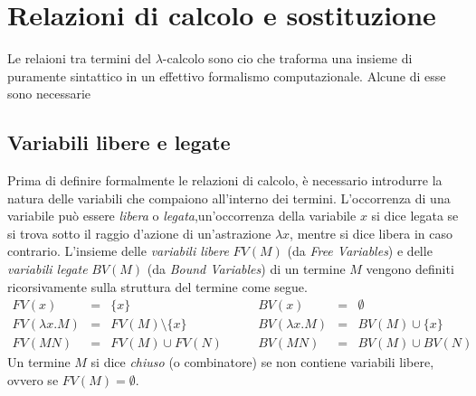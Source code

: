 \section{Relazioni di calcolo e sostituzione}
Le relaioni tra termini del $\lambda$-calcolo sono cio che traforma una insieme di puramente sintattico in un effettivo formalismo computazionale. 
Alcune di esse sono necessarie 

\subsection{Variabili libere e legate}
Prima di definire formalmente le relazioni di calcolo, è necessario introdurre la natura delle variabili che compaiono all'interno dei termini. L'occorrenza 
di una variabile può essere \emph{libera} o \emph{legata},un'occorrenza della variabile $x$ si dice legata se si trova sotto il raggio d'azione di un'astrazione 
$\lambda x$, mentre si dice libera in caso contrario. L'insieme delle \emph{variabili libere} $FV(M)$ (da \emph{Free Variables}) e delle \emph{variabili legate} 
$BV(M)$ (da \emph{Bound Variables}) di un termine $M$ vengono definiti ricorsivamente sulla struttura del termine come segue.
\begin{equation}
    \begin{array}{lcl}
        FV(x)            & = & \{x\}                 \\
        FV(\lambda x. M) & = & FV(M) \setminus \{x\} \\
        FV(M N)          & = & FV(M) \cup FV(N)
    \end{array}
    \qquad
    \begin{array}{lcl}
        BV(x)            & = & \emptyset        \\
        BV(\lambda x. M) & = & BV(M) \cup \{x\} \\
        BV(M N)          & = & BV(M) \cup BV(N)
    \end{array}
    \label{eq:fv_bv_definitions}
\end{equation}
Un termine $M$ si dice \emph{chiuso} (o combinatore) se non contiene variabili libere, ovvero se $FV(M) = \emptyset$.

